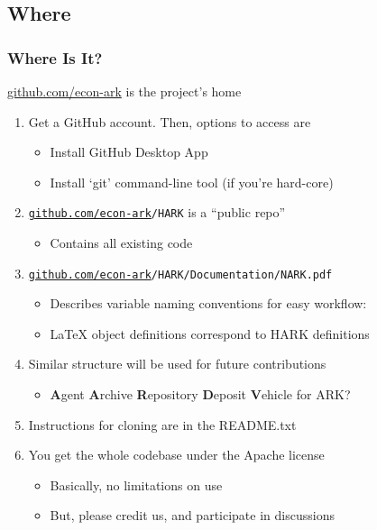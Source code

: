 \documentclass[public]{beamer}
\providecommand{\ARK}{\href{http://github.com/econ-ark}{github.com/econ-ark}}
\begin{document}
\subsection{Where}
\begin{frame}
\frametitle{Where Is It?}

\begin{center}
{\ARK} is the project's home
\end{center}

\begin{enumerate}
\item Get a GitHub account.  Then, options to access are
\begin{itemize}
\item Install GitHub Desktop App
\item Install `git' command-line tool (if you're hard-core)
\end{itemize}
\item \texttt{{\ARK}/HARK} is a ``public repo'' 
\begin{itemize}
\item Contains all existing code
\end{itemize}
\item \texttt{{\ARK}/HARK/Documentation/NARK.pdf}
\begin{itemize}
\item Describes variable naming conventions for easy workflow: 
\item LaTeX object definitions correspond to HARK definitions 
\end{itemize}
\item Similar structure will be used for future contributions
\begin{itemize}
\item {\bf A}gent {\bf A}rchive {\bf R}epository {\bf D}eposit {\bf V}ehicle for ARK?
\end{itemize}
\item Instructions for cloning are in the README.txt
\item You get the whole codebase under the Apache license 
\begin{itemize}
\item Basically, no limitations on use
\item But, please credit us, and participate in discussions
\end{itemize}
\end{enumerate}

\end{frame}
\end{document}
